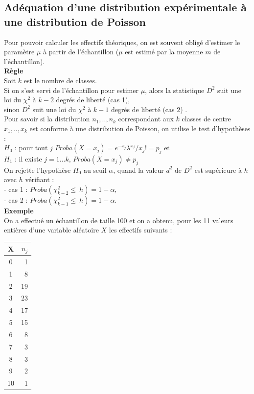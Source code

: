 \documentclass[a4paper,11pt]{book}
\begin{document}
\subsection{Ad\'equation d'une distribution exp\'erimentale \`a une distribution de Poisson}
Pour pouvoir calculer les effectifs th\'eoriques, on est souvent oblig\'e 
d'estimer le param\`etre $\mu$ \`a partir de l'\'echantillon ($\mu$ est 
estim\'e par la moyenne $m$ de l'\'echantillon).\\
{\bf R\`egle}\\
 Soit $k$ est le nombre de classes.\\
Si on s'est servi de l'\'echantillon pour estimer $\mu$, alors la statistique 
$D^2$ suit une loi du $\chi^2$ \`a $k-2$ degr\'es de libert\'e (cas 1),\\
 sinon $D^2$ 
suit une loi du $\chi^2$ \`a $k-1$ degr\'es de libert\'e (cas 2) .\\
Pour savoir si la distribution $n_1,..,n_k$ correspondant aux $k$ classes de centre $x_1,..,x_k$ est conforme \`a une distribution 
de Poisson, on utilise le test d'hypoth\`eses :\\
$H_0$ : pour tout $j$
$Proba(X=x_j)=e^{-x_j}\lambda^{x_j}/x_j!=p_j$ et \\
$H_1$ : il existe $j=1...k$, $Proba(X=x_j)\neq p_j$\\
On rejette l'hypoth\`ese $H_0$ au seuil $\alpha$, quand la valeur $d^2$ de
$D^2$ est sup\'erieure \`a $h$
avec $h$ v\'erifiant :\\
- cas 1 : $Proba(\chi^2_{k-2}\leq\ h)=1-\alpha$,\\
- cas 2 : $Proba(\chi^2_{k-1}\leq\ h)=1-\alpha$.\\
{\bf Exemple}\\
On a effectu\'e  un \'echantillon de taille 100 et on a obtenu, pour les 11
 valeurs enti\`eres d'une variable al\'eatoire $X$ 
les effectifs suivants :\\
\begin{center}
\begin{tabular}{|c|r|}
\hline
X& $n_j$\\
\hline
0&1\\
1&8 \\
2&19 \\
3&23 \\
4&17 \\
5&15 \\
6&8 \\
7& 3\\
8&3 \\
9&2 \\
10&1\\
\hline
\end{tabular}
\end{center}
\end{document}
